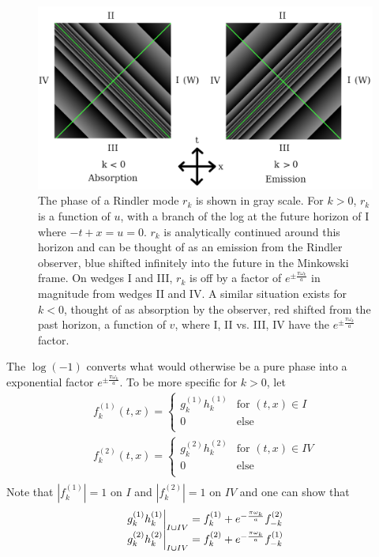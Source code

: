 \documentclass[12pt,a4paper]{article}
\newcommand\restr[2]{{%
  \left.\kern-\nulldelimiterspace %
  #1 %
  \vphantom{\big|} %
  \right|_{#2} %
  }}
\begin{document}
\begin{figure}[h]
  \centering
  \captionsetup{width=0.8\linewidth}
\includegraphics[scale=0.3]{analytic.png}
\caption{The phase of a Rindler mode $r_k$ is shown in gray scale. For $k>0$, $r_k$ is a function of $u$, with a branch of the log at the future horizon of I where $-t + x = u = 0$. $r_k$ is analytically continued around this horizon and can be thought of as an emission from the Rindler observer, blue shifted infinitely into the future in the Minkowski frame. On wedges I and III, $r_k$ is off by a factor of $e^{\pm \frac{\pi \omega_k}{a}}$ in magnitude from wedges II and IV.  A similar situation exists for $k<0$, thought of as absorption by the observer, red shifted from the past horizon, a function of $v$, where I, II vs. III, IV have the $e^{\pm \frac{\pi \omega_k}{a}}$ factor.}
\label{analytic}
\end{figure}

The $\log(-1)$ converts what would otherwise be a pure phase into a exponential factor $e^{\pm \frac{\pi \omega_k}{a}}$.  To be more specific for $k>0$, let
\begin{equation}
\begin{array}{l}
f_k^{(1)}(t,x) = \left\{ \begin{array}{ll}
  g_k^{(1)} h_k^{(1)} & \text{for } (t,x) \in I \\
    0 & \text{else} \\ \end{array} \right. \\
f_k^{(2)}(t,x) = \left\{ \begin{array}{ll}
  g_k^{(2)} h_k^{(2)} & \text{for } (t,x) \in IV \\
  0 & \text{else} \\ \end{array} \right. \\
\end{array}
\end{equation}
Note that $\left|f_k^{(1)}\right| = 1$ on $I$ and $\left|f_k^{(2)}\right| = 1$ on $IV$ and one can show that
\begin{equation}
  \begin{array}{l}
    \restr{g_k^{(1)} h_k^{(1)}}{I \cup IV} = f_k^{(1)} + e^{- \frac{\pi \omega_k}{a}} f_{-k}^{(2)} \\
    \restr{g_k^{(2)} h_k^{(2)}}{I \cup IV} = f_k^{(2)} + e^{- \frac{\pi \omega_k}{a}} f_{-k}^{(1)}
  \end{array}
\end{equation}
\end{document}
